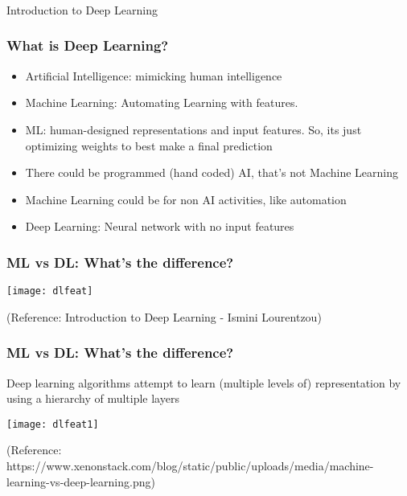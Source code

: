 \begin{frame}[fragile]\frametitle{}
\begin{center}
{\Large Introduction to Deep Learning}
\end{center}
\end{frame}


\begin{frame}[fragile] \frametitle{What is Deep Learning?}

\begin{itemize}
\item Artificial Intelligence: mimicking human intelligence
\item Machine Learning: Automating Learning with features. 
\item ML: human-designed representations and input features.  So, its just optimizing weights to best make a final prediction
\item There could be programmed (hand coded) AI, that's not Machine Learning
\item Machine Learning could be for non AI activities, like automation
\item Deep Learning: Neural network with no input features
\end{itemize}
\end{frame}


\begin{frame}[fragile] \frametitle{ML vs DL: What's the difference?}
\begin{center}
\texttt{[image: dlfeat]}
\end{center}
\tiny{(Reference: Introduction to Deep Learning - Ismini Lourentzou)}
\end{frame}



\begin{frame}[fragile] \frametitle{ML vs DL: What's the difference?}
Deep learning algorithms attempt to learn (multiple levels of) representation by using a hierarchy of multiple layers
\begin{center}
\texttt{[image: dlfeat1]}
\end{center}
\tiny{(Reference: https://www.xenonstack.com/blog/static/public/uploads/media/machine-learning-vs-deep-learning.png)}

\end{frame}

